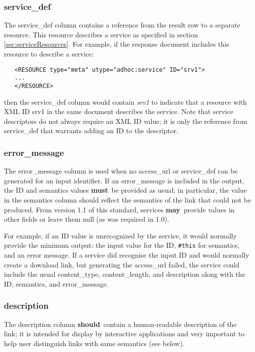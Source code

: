 \documentclass[11pt,a4paper]{ivoa}
\newcommand{\rfcmust}{\textbf{must}}
\newcommand{\rfcshould}{\textbf{should}}
\newcommand{\rfcmay}{\textbf{may}}
\begin{document}
\subsubsection{service\_def}

The service\_def column contains a reference from the result row to
a separate resource. This resource describes a service as specified
in section \ref{sec:serviceResources}.
For example, if the response document includes this resource
to describe a service:
\begin{verbatim}
   <RESOURCE type="meta" utype="adhoc:service" ID="srv1">
   ...
   </RESOURCE>
\end{verbatim}
then the service\_def column would contain {\em srv1\/} to indicate that
a resource with XML ID srv1 in the same document describes the service.
Note that service descriptors do not always require an XML ID value;
it is only the reference from service\_def that warrants adding
an ID to the descriptor.


\subsubsection{error\_message}
\label{sec:errorMessage}

The error\_message column is used when no access\_url or service\_def can be generated for
an input identifier. If an error\_message is included in the output, the
ID and semantics values \rfcmust\ be provided as usual; in particular,
the value in the semantics column should reflect the semantics of the
link that could not be produced.
From version 1.1 of this standard,
services \rfcmay\  provide values in other fields or leave them null (as was required in 1.0).

For example, if an ID value is unrecognized by the service, it would normally provide the
minimum output: the input value for the ID, \verb|#this| for semantics, and an error
message. If a service did recognise the input ID and would normally create a download link,
but generating the access\_url failed, the service could include the usual content\_type,
content\_length, and description along with the ID, semantics, and error\_message.


\subsubsection{description}

The description column \rfcshould\ contain a human-readable description of
the link; it is intended for display by interactive applications and very
important to help user distinguish links with same semantics (see below).
\end{document}
